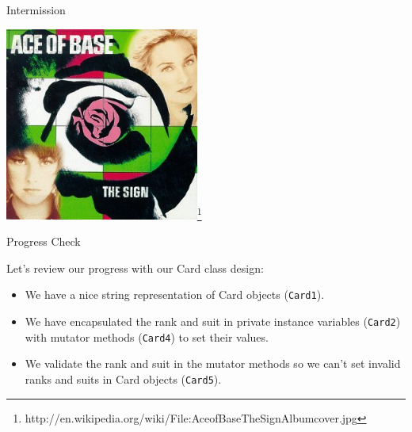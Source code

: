 \documentclass{beamer}
\begin{document}
\begin{frame}[fragile]{Intermission}


\begin{center}
\includegraphics[height=2.5in]{AceofBaseTheSignAlbumcover.jpg}\footnote{http://en.wikipedia.org/wiki/File:AceofBaseTheSignAlbumcover.jpg}
\end{center}


\end{frame}

\begin{frame}[fragile]{Progress Check}


Let's review our progress with our Card class design:
\begin{itemize}
\item We have a nice string representation of Card objects ({\tt Card1}).
\item We have encapsulated the rank and suit in private instance variables ({\tt Card2}) with mutator methods ({\tt Card4}) to set their values.
\item We validate the rank and suit in the mutator methods so we can't set invalid ranks and suits in Card objects ({\tt Card5}).
\end{itemize}


\end{frame}
\end{document}
